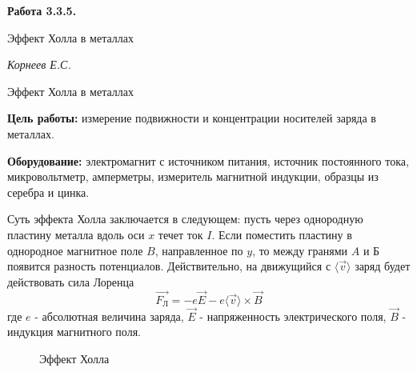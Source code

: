 \documentclass[14pt]{article}
\begin{document}
\begin{titlepage}
	\begin{center}
		\fontsize{18pt}{20pt}\selectfont
		\textbf{Работа 3.3.5.}	
	
		\vspace{5cm}
		\fontsize{24pt}{25pt}\selectfont
		Эффект Холла в металлах
	\end{center}
	\begin{flushright}
		\fontsize{18pt}{20pt}\selectfont
		\vspace{14cm}
		\hspace{-3cm}
		\textit{Корнеев Е.С.}
	\end{flushright}		
\end{titlepage}

\begin{center}
	\fontsize{16pt}{18pt}\selectfont	
	Эффект Холла в металлах
\end{center}


\fontsize{14pt}{16pt}\selectfont
\vspace{1cm}
\textbf{Цель работы:} измерение подвижности и концентрации носителей заряда в металлах.

\vspace{0.5cm}
\textbf{Оборудование:} электромагнит с источником питания, источник постоянного тока, микровольтметр, амперметры, измеритель магнитной индукции, образцы из серебра и цинка. 

\vspace{1cm}
Суть эффекта Холла заключается в следующем: пусть через однородную пластину металла вдоль оси $x$ течет ток $I$. Если поместить пластину в однородное магнитное поле $B$, направленное по $y$, то между гранями $A$ и $\text{Б}$ появится разность потенциалов. Действительно, на движущийся с 
$\langle\vec{v}\rangle$ заряд будет действовать сила Лоренца
$$
	\vec{F_{\text{Л}}} = -e\vec{E} - e\langle\vec{v}\rangle \times \vec{B}
$$
\noindent где $e$ - абсолютная величина заряда, $\vec{E}$ - напряженность электрического поля, $\vec{B}$ - индукция магнитного поля. 

\begin{figure}[h!]
	\caption{Эффект Холла}
	\label{fig:image}
\end{figure}
\end{document}
